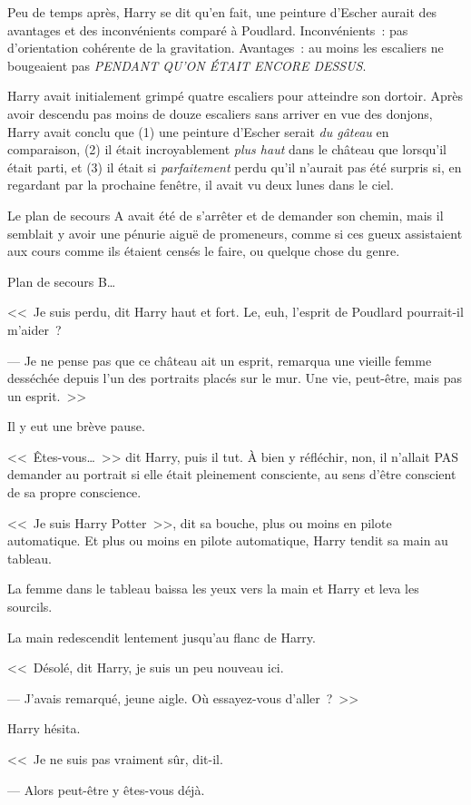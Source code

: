 Peu de temps après, Harry se dit qu'en fait, une peinture d'Escher aurait des avantages et des inconvénients comparé à Poudlard. Inconvénients~: pas d'orientation cohérente de la gravitation. Avantages~: au moins les escaliers ne bougeaient pas \emph{PENDANT QU'ON ÉTAIT ENCORE DESSUS}.

Harry avait initialement grimpé quatre escaliers pour atteindre son dortoir. Après avoir descendu pas moins de douze escaliers sans arriver en vue des donjons, Harry avait conclu que (1) une peinture d'Escher serait \emph{du gâteau} en comparaison, (2) il était incroyablement \emph{plus haut} dans le château que lorsqu'il était parti, et (3) il était si \emph{parfaitement} perdu qu'il n'aurait pas été surpris si, en regardant par la prochaine fenêtre, il avait vu deux lunes dans le ciel.

Le plan de secours A avait été de s'arrêter et de demander son chemin, mais il semblait y avoir une pénurie aiguë de promeneurs, comme si ces gueux assistaient aux cours comme ils étaient censés le faire, ou quelque chose du genre.

Plan de secours B…

<<~Je suis perdu, dit Harry haut et fort. Le, euh, l'esprit de Poudlard pourrait-il m'aider~?

--- Je ne pense pas que ce château ait un esprit, remarqua une vieille femme desséchée depuis l'un des portraits placés sur le mur. Une vie, peut-être, mais pas un esprit.~>>

Il y eut une brève pause.

<<~Êtes-vous…~>> dit Harry, puis il tut. À bien y réfléchir, non, il n'allait PAS demander au portrait si elle était pleinement consciente, au sens d'être conscient de sa propre conscience.

<<~Je suis Harry Potter~>>, dit sa bouche, plus ou moins en pilote automatique. Et plus ou moins en pilote automatique, Harry tendit sa main au tableau.

La femme dans le tableau baissa les yeux vers la main et Harry et leva les sourcils.

La main redescendit lentement jusqu'au flanc de Harry.

<<~Désolé, dit Harry, je suis un peu nouveau ici.

--- J'avais remarqué, jeune aigle. Où essayez-vous d'aller~?~>>

Harry hésita.

<<~Je ne suis pas vraiment sûr, dit-il.

--- Alors peut-être y êtes-vous déjà.

